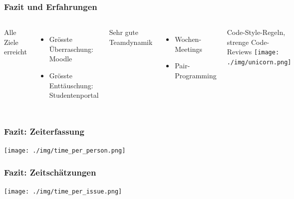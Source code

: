 \documentclass{beamer}
\begin{document}
	\begin{frame}
		\frametitle{Fazit und Erfahrungen}
		\begin{columns}
			Alle Ziele erreicht
				\begin{itemize}
					    \item Grösste Überraschung: Moodle
					    \item Grösste Enttäuschung: Studentenportal
				\end{itemize}
			Sehr gute Teamdynamik
			\begin{itemize}
				\item Wochen-Meetings	
				\item Pair-Programming
			\end{itemize}
			Code-Style-Regeln, strenge Code-Reviews
			\texttt{[image: ./img/unicorn.png]}
		\end{columns}
	\end{frame}

  \begin{frame}
    \frametitle{Fazit: Zeiterfassung}
    \texttt{[image: ./img/time\_per\_person.png]}
  \end{frame}

  \begin{frame}
    \frametitle{Fazit: Zeitschätzungen}
    \texttt{[image: ./img/time\_per\_issue.png]}
  \end{frame}
\end{document}
